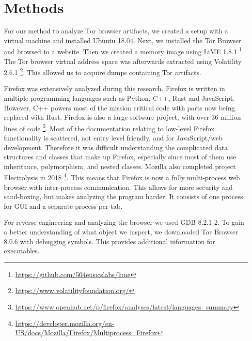 \section{Methods}
\label{sec:methods}

For our method to analyze Tor browser artifacts, we created a setup
with a virtual machine and installed Ubuntu 18.04. Next, we installed
the Tor Browser and browsed to a website. Then we created a memory
image using LiME 1.8.1
\footnote{\url{https://github.com/504ensicslabs/lime}}. The Tor
browser virtual address space was afterwards extracted using
Volatility 2.6.1
\footnote{\url{https://www.volatilityfoundation.org/}}. This allowed
us to acquire dumps containing Tor artifacts.

Firefox was extensively analyzed during this research. Firefox is
written in multiple programming languages such as Python, C++, Rust
and JavaScript. However, C++ powers most of the mission critical code
with parts now being replaced with Rust. Firefox is also a large
software project, with over 36 million lines of code
\footnote{\url{https://www.openhub.net/p/firefox/analyses/latest/languages_summary}}.
Most of the documentation relating to low-level Firefox functionality
is scattered, not entry level friendly, and for JavaScript/web
development. Therefore it was difficult understanding the complicated
data structures and classes that make up Firefox, especially since most
of them use inheritance, polymorphism, and nested classes. Mozilla
also completed project Electrolysis in 2018
\footnote{\url{https://developer.mozilla.org/en-US/docs/Mozilla/Firefox/Multiprocess_Firefox}}.
This means that Firefox is now a fully multi-process web browser with
inter-process communication. This allows for more security and
sand-boxing, but makes analyzing the program harder. It consists of one
process for GUI and a separate process per tab.

For reverse engineering and analyzing the browser we used GDB
8.2.1-2. To gain a better understanding of what object we inspect, we
downloaded Tor Browser 8.0.6 with debugging symbols. This provides
additional information for executables.


